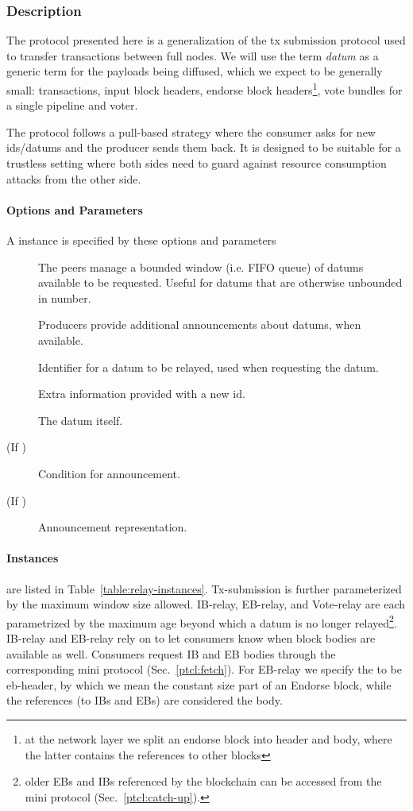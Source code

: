 \subsubsection{Description}
The \relay protocol presented here is a generalization of the tx
submission protocol used to transfer transactions between full
nodes. We will use the term \emph{datum} as a generic term for the
payloads being diffused, which we expect to be generally small:
transactions, input block headers, endorse block headers\footnote{at
the network layer we split an endorse block into header and body,
where the latter contains the references to other blocks}, vote
bundles for a single pipeline and voter.

The protocol follows a pull-based strategy where the consumer asks for
new ids/datums and the producer sends them back. It is designed to be
suitable for a trustless setting where both sides need to guard
against resource consumption attacks from the other side.

\paragraph{Options and Parameters} A \relay{} instance is specified by these options and parameters
\begin{description}
\item [\BoundedWindow] The peers manage a bounded window (i.e. FIFO queue) of datums available to be requested. Useful for datums that are otherwise unbounded in number.
\item [\Announcements] Producers provide additional announcements about datums, when available.
\item [\id{}] Identifier for a datum to be relayed, used when requesting the datum.
\item [\info{}] Extra information provided with a new id.
\item [\datum{}] The datum itself.
\item [\annCond{} (If \Announcements)] Condition for announcement.
\item [\ann{} (If \Announcements)] Announcement representation.
\end{description}

\paragraph{Instances} are listed in Table~\ref{table:relay-instances}.
Tx-submission is further parameterized by the maximum window size
allowed. IB-relay, EB-relay, and Vote-relay are each parametrized by
the maximum age beyond which a datum is no longer
relayed\footnote{older EBs and IBs referenced by the blockchain can be
accessed from the \catchup{} mini protocol (Sec.~\ref{ptcl:catch-up}).}. IB-relay and
EB-relay rely on \Announcements{} to let consumers know when block bodies
are available as well. Consumers request IB and EB bodies through the corresponding
\fetch{} mini protocol (Sec.~\ref{ptcl:fetch}). For EB-relay we specify the \datum{} to be eb-header, by which we mean the constant size part of an Endorse block, while the references (to IBs and EBs) are considered the body.

